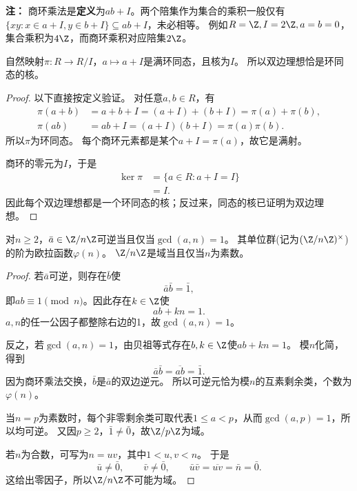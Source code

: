 \textbf{注：}
商环乘法是\textbf{定义}为$ab+I$。两个陪集作为集合的乘积一般仅有
$\{xy:x\in a+I,y\in b+I\}\subseteq ab+I$，未必相等。
例如$R=\Z,I=2\Z,a=b=0$，集合乘积为$4\Z$，而商环乘积对应陪集$2\Z$。

\begin{proposition}
自然映射$\pi:R\to R/I$，$a\mapsto a+I$是满环同态，且核为$I$。
所以双边理想恰是环同态的核。
\end{proposition}
\begin{proof}
以下直接按定义验证。
对任意$a,b\in R$，有
\[
\begin{aligned}
\pi(a+b)&=a+b+I=(a+I)+(b+I)=\pi(a)+\pi(b),\\
\pi(ab)&=ab+I=(a+I)(b+I)=\pi(a)\pi(b).
\end{aligned}
\]
所以$\pi$为环同态。
每个商环元素都是某个$a+I=\pi(a)$，故它是满射。

商环的零元为$I$，于是
\[
\begin{aligned}
\ker\pi
&=\{a\in R:a+I=I\}\\
&=I.
\end{aligned}
\]
因此每个双边理想都是一个环同态的核；反过来，同态的核已证明为双边理想。
\end{proof}

\begin{proposition}
对$n\geq2$，$\bar a\in\Z/n\Z$可逆当且仅当$\gcd(a,n)=1$。
其单位群(记为$(\Z/n\Z)^{\times}$)的阶为欧拉函数$\varphi(n)$。
$\Z/n\Z$是域当且仅当$n$为素数。
\end{proposition}
\begin{proof}
若$\bar a$可逆，则存在$\bar b$使
\[
\bar a\bar b=\bar1,
\]
即$ab\equiv1\pmod n$。因此存在$k\in\Z$使
\[
ab+kn=1.
\]
$a,n$的任一公因子都整除右边的1，故$\gcd(a,n)=1$。

反之，若$\gcd(a,n)=1$，由贝祖等式存在$b,k\in\Z$使$ab+kn=1$。
模$n$化简，得到
\[
\bar a\bar b=\overline{ab}=\bar1.
\]
因为商环乘法交换，$\bar b$是$\bar a$的双边逆元。
所以可逆元恰为模$n$的互素剩余类，个数为$\varphi(n)$。

当$n=p$为素数时，每个非零剩余类可取代表$1\leq a<p$，从而$\gcd(a,p)=1$，所以均可逆。
又因$p\geq2$，$\bar1\neq\bar0$，故$\Z/p\Z$为域。

若$n$为合数，可写为$n=uv$，其中$1<u,v<n$。
于是
\[
\bar u\neq\bar0,\qquad \bar v\neq\bar0,
\qquad \bar u\bar v=\overline{uv}=\bar n=\bar0.
\]
这给出零因子，所以$\Z/n\Z$不可能为域。
\end{proof}


